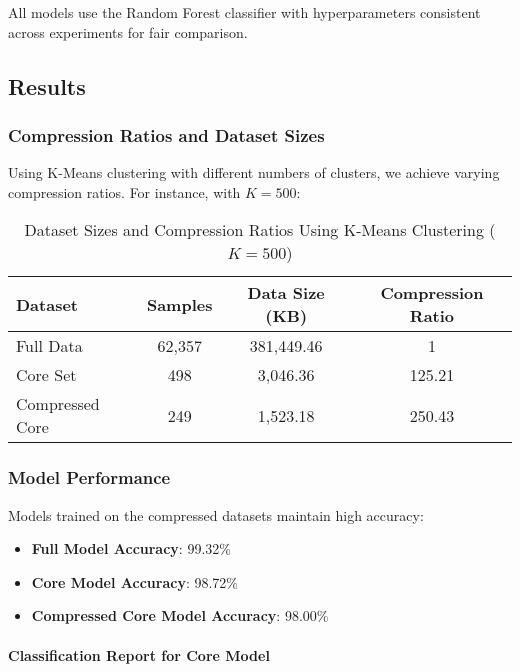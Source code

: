 \documentclass{article}
\begin{document}
All models use the Random Forest classifier with hyperparameters consistent across experiments for fair comparison.

\subsection{Results}

\subsubsection{Compression Ratios and Dataset Sizes}

Using K-Means clustering with different numbers of clusters, we achieve varying compression ratios. For instance, with $K = 500$:

\begin{table}[H]
\centering
\begin{tabular}{lccc}
\hline
\textbf{Dataset} & \textbf{Samples} & \textbf{Data Size (KB)} & \textbf{Compression Ratio} \\
\hline
Full Data & 62,357 & 381,449.46 & 1 \\
Core Set & 498 & 3,046.36 & 125.21 \\
Compressed Core & 249 & 1,523.18 & 250.43 \\
\hline
\end{tabular}
\caption{Dataset Sizes and Compression Ratios Using K-Means Clustering ($K=500$)}
\end{table}

\subsubsection{Model Performance}

Models trained on the compressed datasets maintain high accuracy:

\begin{itemize}
    \item \textbf{Full Model Accuracy}: 99.32\%
    \item \textbf{Core Model Accuracy}: 98.72\%
    \item \textbf{Compressed Core Model Accuracy}: 98.00\%
\end{itemize}

\paragraph{Classification Report for Core Model}
\end{document}
